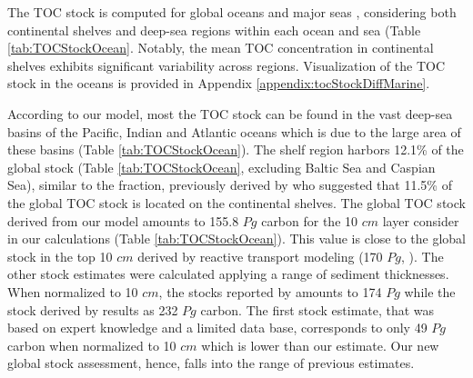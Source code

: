 \documentclass[journal abbreviation, manuscript]{copernicus}
\begin{document}
The TOC stock is computed for global oceans and major seas \citep{FlandersMarineInstitute2021},  considering both continental shelves and deep-sea regions within each ocean and sea (Table \ref{tab:TOCStockOcean}. Notably, the mean TOC concentration in continental shelves exhibits significant variability across regions. Visualization of the TOC stock in the oceans is provided in Appendix \ref{appendix:tocStockDiffMarine}.

According to our  model, most the TOC stock can be found in the vast deep-sea basins of the Pacific, Indian and Atlantic oceans which is due to the large area of these basins (Table \ref{tab:TOCStockOcean}). The shelf region harbors 12.1\% of the global stock (Table \ref{tab:TOCStockOcean}, excluding Baltic Sea and Caspian Sea), similar to the fraction, previously derived by \cite{atwood2020} who suggested that 11.5\% of the global TOC stock is located on the continental shelves. The global TOC stock derived from our model amounts to 155.8 $Pg$ carbon for the 10 $cm$ layer consider in our calculations (Table \ref{tab:TOCStockOcean}). This value is close to the global stock in the top 10 $cm$ derived by reactive transport modeling (170 $Pg$, \cite{larowe2020b}). The other stock estimates were calculated applying a range of sediment thicknesses. When normalized to 10 $cm$, the stocks reported by \cite{LeeTOCkNN} amounts to 174 $Pg$ while the stock derived by \cite{atwood2020} results as 232 $Pg$ carbon. The first stock estimate, that was based on expert knowledge and a limited data base, corresponds to only 49 $Pg$ carbon when normalized to 10 $cm$ \citep{Emerson1988} which is lower than our estimate. Our new global stock assessment, hence, falls into the range of previous estimates.%
\end{document}
